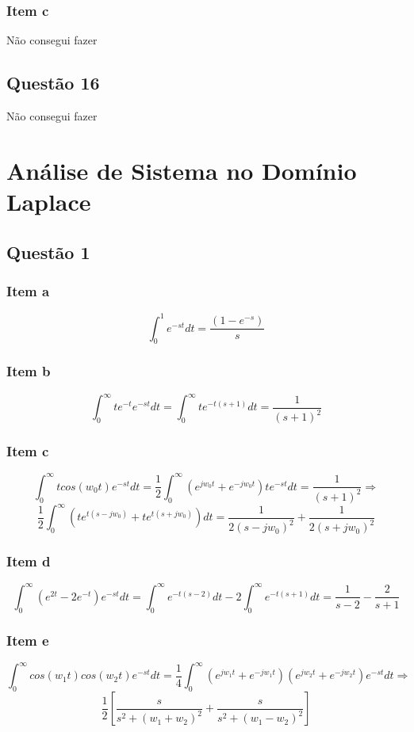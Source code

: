 \documentclass[a4paper, 12pt]{article}
\begin{document}
    \subsubsection{Item c}     
	Não consegui fazer
    \subsection{Quest\~{a}o 16}
    Não consegui fazer
    \section{An\'{a}lise de Sistema no Dom\'{i}nio Laplace}      
    \subsection{Quest\~{a}o 1}
    \subsubsection{Item a} 
    \[\int_{0}^{1} e^{-st}dt = \frac{(1-e^{-s})}{s} \]
    \subsubsection{Item b} 
    \[\int_{0}^{\infty} te^{-t}e^{-st}dt = \int_{0}^{\infty} te^{-t(s+1)}dt = \frac{1}{(s+1)^{2}}\]
    \subsubsection{Item c} 
    \[\int_{0}^{\infty} tcos(w_{0}t)e^{-st}dt = \frac{1}{2}\int_{0}^{\infty}(e^{jw_{0}t} + e^{-jw_{0}t})te^{-st}dt = \frac{1}{(s+1)^{2}} \Rightarrow\]
    \[\frac{1}{2}\int_{0}^{\infty}(te^{t(s-jw_{0})} + te^{t(s+jw_{0})})dt = \frac{1}{2(s-jw_{0})^{2}} +\frac{1}{2(s+jw_{0})^{2}}\]
    \subsubsection{Item d} 
    \[\int_{0}^{\infty} (e^{2t}-2e^{-t})e^{-st}dt = \int_{0}^{\infty} e^{-t(s-2)}dt - 2\int_{0}^{\infty}e^{-t(s+1)}dt = \frac{1}{s-2} - \frac{2}{s+1}\]
    \subsubsection{Item e} 
    \[\int_{0}^{\infty} cos(w_{1}t)cos(w_{2}t)e^{-st}dt = \frac{1}{4}\int_{0}^{\infty}(e^{jw_{1}t} + e^{-jw_{1}t})(e^{jw_{2}t} + e^{-jw_{2}t})e^{-st}dt \Rightarrow\]
    \[\frac{1}{2}[\frac{s}{s^{2}+(w_{1}+w_{2})^{2}} + \frac{s}{s^{2}+(w_{1}-w_{2})^{2}}]\]    
\end{document}
